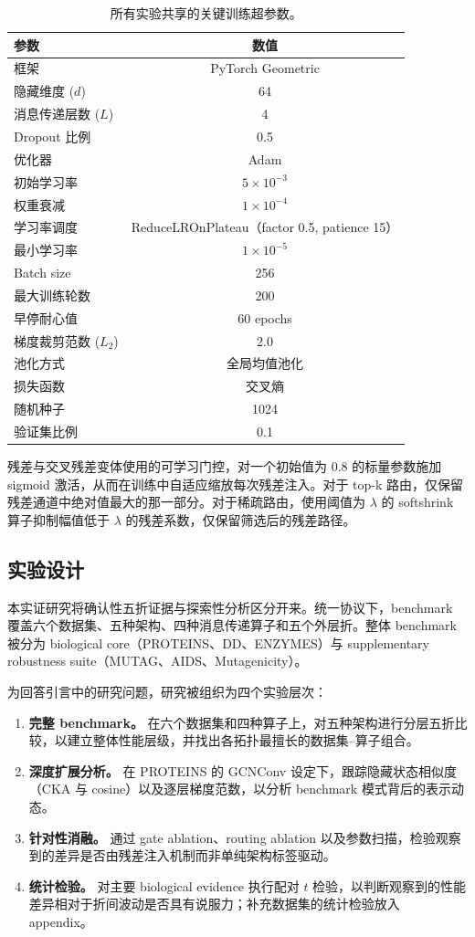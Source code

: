 \begin{table}[h]
\centering
\small
\caption{所有实验共享的关键训练超参数。}
\label{tab:hyperparams}
\begin{tabular}{l c}
\toprule
参数 & 数值 \\
\midrule
框架 & PyTorch Geometric \\
隐藏维度 ($d$) & 64 \\
消息传递层数 ($L$) & 4 \\
Dropout 比例 & 0.5 \\
优化器 & Adam \\
初始学习率 & $5\times10^{-3}$ \\
权重衰减 & $1\times10^{-4}$ \\
学习率调度 & ReduceLROnPlateau（factor 0.5, patience 15） \\
最小学习率 & $1\times10^{-5}$ \\
Batch size & 256 \\
最大训练轮数 & 200 \\
早停耐心值 & 60 epochs \\
梯度裁剪范数 ($L_2$) & 2.0 \\
池化方式 & 全局均值池化 \\
损失函数 & 交叉熵 \\
随机种子 & 1024 \\
验证集比例 & 0.1 \\
\bottomrule
\end{tabular}
\end{table}

残差与交叉残差变体使用的可学习门控，对一个初始值为 0.8 的标量参数施加 sigmoid 激活，从而在训练中自适应缩放每次残差注入。对于 top-k 路由，仅保留残差通道中绝对值最大的那一部分。对于稀疏路由，使用阈值为 $\lambda$ 的 softshrink 算子抑制幅值低于 $\lambda$ 的残差系数，仅保留筛选后的残差路径。

\subsection{实验设计}

本实证研究将确认性五折证据与探索性分析区分开来。统一协议下，benchmark 覆盖六个数据集、五种架构、四种消息传递算子和五个外层折。整体 benchmark 被分为 biological core（PROTEINS、DD、ENZYMES）与 supplementary robustness suite（MUTAG、AIDS、Mutagenicity）。

为回答引言中的研究问题，研究被组织为四个实验层次：

\begin{enumerate}
    \item \textbf{完整 benchmark。} 在六个数据集和四种算子上，对五种架构进行分层五折比较，以建立整体性能层级，并找出各拓扑最擅长的数据集--算子组合。
    \item \textbf{深度扩展分析。} 在 PROTEINS 的 GCNConv 设定下，跟踪隐藏状态相似度（CKA 与 cosine）以及逐层梯度范数，以分析 benchmark 模式背后的表示动态。
    \item \textbf{针对性消融。} 通过 gate ablation、routing ablation 以及参数扫描，检验观察到的差异是否由残差注入机制而非单纯架构标签驱动。
    \item \textbf{统计检验。} 对主要 biological evidence 执行配对 $t$ 检验，以判断观察到的性能差异相对于折间波动是否具有说服力；补充数据集的统计检验放入 appendix。
\end{enumerate}
